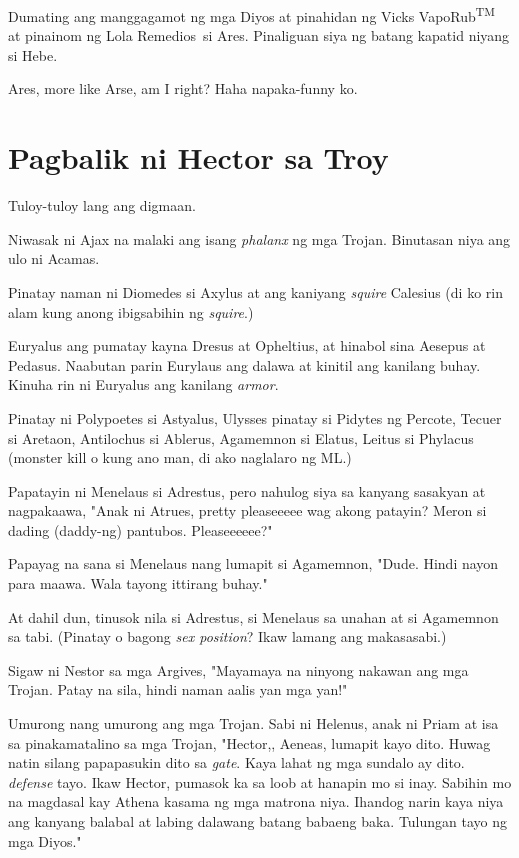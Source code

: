 \documentclass[12pt,letterpaper]{report}
\begin{document}
Dumating ang manggagamot ng mga Diyos at pinahidan ng Vicks VapoRub\textsuperscript{TM} at pinainom ng Lola Remedios\texttrademark\ si Ares. Pinaliguan siya ng batang kapatid niyang si Hebe.

Ares, more like Arse, am I right? Haha napaka-funny ko.
\pagebreak
\chapter{Pagbalik ni Hector sa Troy}

Tuloy-tuloy lang ang digmaan.

Niwasak ni Ajax na malaki ang isang \textit{phalanx} ng mga Trojan. Binutasan niya ang ulo ni Acamas.

Pinatay naman ni Diomedes si Axylus at ang kaniyang \textit{squire} Calesius (di ko rin alam kung anong ibigsabihin ng \textit{squire}.)

Euryalus ang pumatay kayna Dresus at Opheltius, at hinabol sina Aesepus at Pedasus. Naabutan parin Eurylaus ang dalawa at kinitil ang kanilang buhay. Kinuha rin ni Euryalus ang kanilang \textit{armor}.

Pinatay ni Polypoetes si Astyalus, Ulysses pinatay si Pidytes ng Percote, Tecuer si Aretaon, Antilochus si Ablerus, Agamemnon si Elatus, Leitus si Phylacus (monster kill o kung ano man, di ako naglalaro ng ML.)

Papatayin ni Menelaus si Adrestus, pero nahulog siya sa kanyang sasakyan at nagpakaawa, "Anak ni Atrues, pretty pleaseeeee wag akong patayin? Meron si dading (daddy-ng) pantubos. Pleaseeeeee?"

Papayag na sana si Menelaus nang lumapit si Agamemnon, "Dude. Hindi nayon para maawa. Wala tayong ittirang buhay."

At dahil dun, tinusok nila si Adrestus, si Menelaus sa unahan at si Agamemnon sa tabi. (Pinatay o bagong \textit{sex position}? Ikaw lamang ang makasasabi.)

Sigaw ni Nestor sa mga Argives, "Mayamaya na ninyong nakawan ang mga Trojan. Patay na sila, hindi naman aalis yan mga yan!"

Umurong nang umurong ang mga Trojan. Sabi ni Helenus, anak ni Priam at isa sa pinakamatalino sa mga Trojan, "Hector,, Aeneas, lumapit kayo dito. Huwag natin silang papapasukin dito sa \textit{gate}. Kaya lahat ng mga sundalo ay dito. \textit{defense} tayo. Ikaw Hector, pumasok ka sa loob at hanapin mo si inay. Sabihin mo na magdasal kay Athena kasama ng mga matrona niya. Ihandog narin kaya niya ang kanyang balabal at labing dalawang batang babaeng baka. Tulungan tayo ng mga Diyos."
\end{document}
